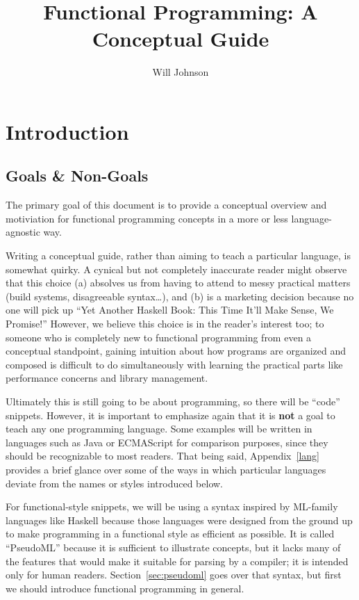 \documentclass{book}
\title{Functional Programming: A Conceptual Guide}
\author{Will Johnson}
\begin{document}
\maketitle
\tableofcontents

\chapter{Introduction}

\section{Goals \& Non-Goals}

The primary goal of this document is to provide a conceptual overview and motiviation for functional programming concepts in a more or less language-agnostic way.

Writing a conceptual guide, rather than aiming to teach a particular language, is somewhat quirky. A cynical but not completely inaccurate reader might observe that this choice (a) absolves us from having to attend to messy practical matters (build systems, disagreeable syntax\ldots), and (b) is a marketing decision because no one will pick up ``Yet Another Haskell Book: This Time It'll Make Sense, We Promise!'' However, we believe this choice is in the reader's interest too; to someone who is completely new to functional programming from even a conceptual standpoint, gaining intuition about how programs are organized and composed is difficult to do simultaneously with learning the practical parts like performance concerns and library management.

Ultimately this is still going to be about programming, so there will be ``code'' snippets. However, it is important to emphasize again that it is \textbf{not} a goal to teach any one programming language. Some examples will be written in languages such as Java or ECMAScript for comparison purposes, since they should be recognizable to most readers. That being said, Appendix~\ref{lang} provides a brief glance over some of the ways in which particular languages deviate from the names or styles introduced below.

For functional-style snippets, we will be using a syntax inspired by ML-family languages like Haskell because those languages were designed from the ground up to make programming in a functional style as efficient as possible. It is called ``PseudoML'' because it is sufficient to illustrate concepts, but it lacks many of the features that would make it suitable for parsing by a compiler; it is intended only for human readers. Section~\ref{sec:pseudoml} goes over that syntax, but first we should introduce functional programming in general.
\end{document}
